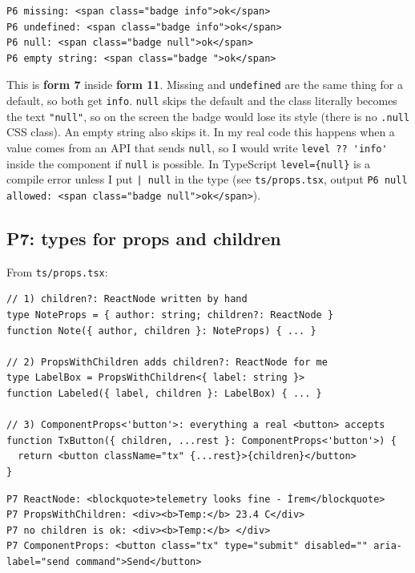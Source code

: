 \begin{lstlisting}
P6 missing: <span class="badge info">ok</span>
P6 undefined: <span class="badge info">ok</span>
P6 null: <span class="badge null">ok</span>
P6 empty string: <span class="badge ">ok</span>
\end{lstlisting}

This is \textbf{form 7} inside \textbf{form 11}. Missing and \passthrough{\lstinline!undefined!} are the same thing for a default, so both get \passthrough{\lstinline!info!}. \passthrough{\lstinline!null!} skips the default and the class literally becomes the text \passthrough{\lstinline!"null"!}, so on the screen the badge would lose its style (there is no \passthrough{\lstinline!.null!} CSS class). An empty string also skips it. In my real code this happens when a value comes from an API that sends \passthrough{\lstinline!null!}, so I would write \passthrough{\lstinline!level ?? 'info'!} inside the component if \passthrough{\lstinline!null!} is possible. In TypeScript \passthrough{\lstinline!level=\{null\}!} is a compile error unless I put \passthrough{\lstinline!| null!} in the type (see \passthrough{\lstinline!ts/props.tsx!}, output \passthrough{\lstinline!P6 null allowed: <span class="badge null">ok</span>!}).

\hypertarget{p7-types-for-props-and-children}{%
\subsection{P7: types for props and children}\label{p7-types-for-props-and-children}}

From \passthrough{\lstinline!ts/props.tsx!}:

\begin{lstlisting}
// 1) children?: ReactNode written by hand
type NoteProps = { author: string; children?: ReactNode }
function Note({ author, children }: NoteProps) { ... }

// 2) PropsWithChildren adds children?: ReactNode for me
type LabelBox = PropsWithChildren<{ label: string }>
function Labeled({ label, children }: LabelBox) { ... }

// 3) ComponentProps<'button'>: everything a real <button> accepts
function TxButton({ children, ...rest }: ComponentProps<'button'>) {
  return <button className="tx" {...rest}>{children}</button>
}
\end{lstlisting}

\begin{lstlisting}
P7 ReactNode: <blockquote>telemetry looks fine - İrem</blockquote>
P7 PropsWithChildren: <div><b>Temp:</b> 23.4 C</div>
P7 no children is ok: <div><b>Temp:</b> </div>
P7 ComponentProps: <button class="tx" type="submit" disabled="" aria-label="send command">Send</button>
\end{lstlisting}


